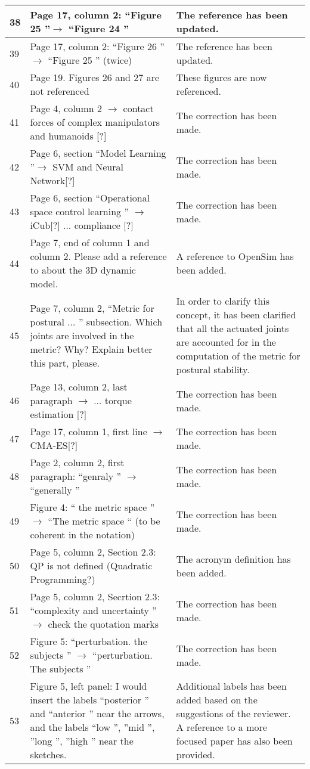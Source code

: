\documentclass[12pt,a4paper]{article}
\begin{document}
\begin{longtable}[!h]{|p{0.3cm}|p{8.5cm}||p{9cm}|}
38	& Page 17, column 2:  ``Figure 25 ''$\rightarrow$  ``Figure 24 '' & The reference has been updated.\tabularnewline \hline
39	& Page 17, column 2:  ``Figure 26 ''$\rightarrow$  ``Figure 25 '' (twice) & The reference has been updated.\tabularnewline \hline
40	& Page 19. Figures 26 and 27 are not referenced & These figures are now referenced.\tabularnewline \hline
41	& Page 4, column 2 $\rightarrow$ contact forces of complex manipulators and humanoids [?] & The correction has been made.\tabularnewline \hline
42	& Page 6, section  ``Model Learning ''$\rightarrow$ SVM and Neural Network[?] & The correction has been made.\tabularnewline \hline
43	& Page 6, section  ``Operational space control learning '' $\rightarrow$ iCub[?] ... compliance [?] & The correction has been made.\tabularnewline \hline
44	& Page 7, end of column 1 and column 2. Please add a reference to about the 3D dynamic model. & A reference to OpenSim has been added.\tabularnewline \hline
45	& Page 7, column 2,  ``Metric for postural ... '' subsection. Which joints are involved in the metric? Why? Explain better this part, please. & In order to clarify this concept, it has been clarified that all the actuated joints are accounted for in the computation of the metric for postural stability.\tabularnewline \hline
46	& Page 13, column 2, last paragraph $\rightarrow$ ... torque estimation [?] & The correction has been made.\tabularnewline \hline
47	& Page 17, column 1, first line $\rightarrow$ CMA-ES[?] & The correction has been made.\tabularnewline \hline
48	& Page 2, column 2, first paragraph:  ``genraly '' $\rightarrow$  ``generally '' & The correction has been made.\tabularnewline \hline
49	& Figure 4:  `` the metric space ''$\rightarrow$  ``The metric space `` (to be coherent in the notation) & The correction has been made.\tabularnewline \hline
50	& Page 5, column 2, Section 2.3: QP is not defined (Quadratic Programming?) & The acronym definition has been added.\tabularnewline \hline
51	& Page 5, column 2, Secrtion 2.3:  ``complexity and uncertainty '' $\rightarrow$ check the quotation marks & The correction has been made.\tabularnewline \hline
52	& Figure 5:  ``perturbation. the subjects '' $\rightarrow$  ``perturbation. The subjects '' & The correction has been made.\tabularnewline \hline
53	& Figure 5, left panel: I would insert the labels  ``posterior '' and  ``anterior '' near the arrows, and the labels  ``low '', ''mid '', ''long '', ''high '' near the sketches. & Additional labels has been added based on the suggestions of the reviewer. A reference to a more focused paper has also been provided.\tabularnewline \hline

\end{longtable}
\end{document}
